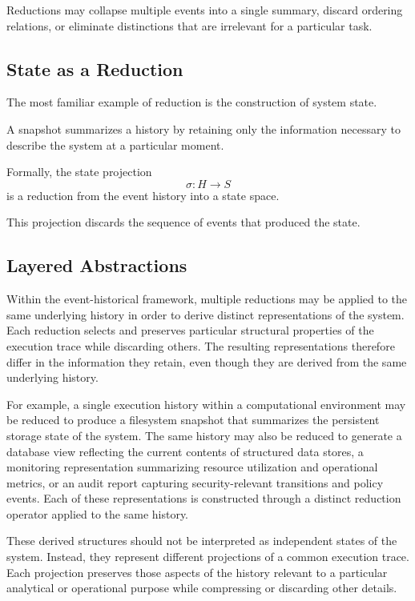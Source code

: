 \documentclass[12pt]{article}
\begin{document}
Reductions may collapse multiple events into a single
summary, discard ordering relations, or eliminate
distinctions that are irrelevant for a particular task.

\subsection{State as a Reduction}

The most familiar example of reduction is the construction
of system state.

A snapshot summarizes a history by retaining only the
information necessary to describe the system at a
particular moment.

Formally, the state projection
\[
\sigma : H \rightarrow S
\]
is a reduction from the event history into a state space.

This projection discards the sequence of events
that produced the state.

\subsection{Layered Abstractions}

Within the event-historical framework, multiple reductions
may be applied to the same underlying history in order to
derive distinct representations of the system. Each reduction
selects and preserves particular structural properties of
the execution trace while discarding others. The resulting
representations therefore differ in the information they
retain, even though they are derived from the same underlying
history.

For example, a single execution history within a computational
environment may be reduced to produce a filesystem snapshot
that summarizes the persistent storage state of the system.
The same history may also be reduced to generate a database
view reflecting the current contents of structured data
stores, a monitoring representation summarizing resource
utilization and operational metrics, or an audit report
capturing security-relevant transitions and policy events.
Each of these representations is constructed through a
distinct reduction operator applied to the same history.

These derived structures should not be interpreted as
independent states of the system. Instead, they represent
different projections of a common execution trace. Each
projection preserves those aspects of the history relevant
to a particular analytical or operational purpose while
compressing or discarding other details.
\end{document}
